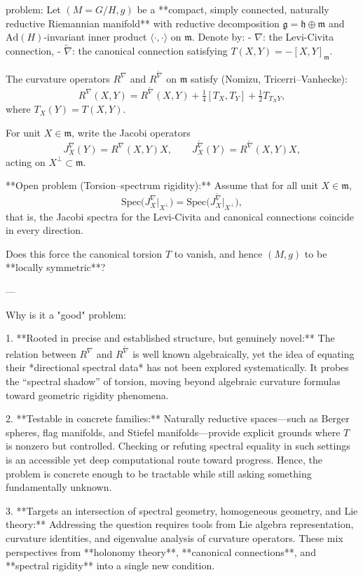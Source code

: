 problem:  
Let \( (M = G/H, g) \) be a **compact, simply connected, naturally reductive Riemannian manifold** with reductive decomposition \( \mathfrak{g} = \mathfrak{h} \oplus \mathfrak{m} \) and \(\mathrm{Ad}(H)\)-invariant inner product \( \langle \cdot , \cdot \rangle\) on \(\mathfrak m\).  
Denote by:  
- \( \nabla \): the Levi-Civita connection,  
- \( \tilde{\nabla} \): the canonical connection satisfying \( T(X,Y) = -[X,Y]_{\mathfrak m} \).

The curvature operators \(R^\nabla\) and \(R^{\tilde{\nabla}}\) on \(\mathfrak m\) satisfy (Nomizu, Tricerri–Vanhecke):
\[
R^\nabla(X,Y) = R^{\tilde{\nabla}}(X,Y) + \tfrac{1}{4}[T_X, T_Y] + \tfrac{1}{2}T_{T_XY},
\]
where \(T_X(Y) = T(X,Y)\).  

For unit \(X \in \mathfrak m\), write the Jacobi operators
\[
J^\nabla_X(Y) = R^\nabla(X,Y)X,  \qquad J^{\tilde{\nabla}}_X(Y) = R^{\tilde{\nabla}}(X,Y)X,
\]
acting on \(X^\perp \subset \mathfrak m\).

**Open problem (Torsion–spectrum rigidity):**  
Assume that for all unit \( X \in \mathfrak m \),
\[
\mathrm{Spec}\big( J^\nabla_X\big|_{X^\perp}\big) = \mathrm{Spec}\big( J^{\tilde{\nabla}}_X\big|_{X^\perp}\big),
\]
that is, the Jacobi spectra for the Levi-Civita and canonical connections coincide in every direction.

Does this force the canonical torsion \(T\) to vanish, and hence \( (M,g) \) to be **locally symmetric**?

---

Why is it a "good" problem:  

1. **Rooted in precise and established structure, but genuinely novel:**  
   The relation between \(R^\nabla\) and \(R^{\tilde{\nabla}}\) is well known algebraically, yet the idea of equating their *directional spectral data* has not been explored systematically. It probes the “spectral shadow” of torsion, moving beyond algebraic curvature formulas toward geometric rigidity phenomena.

2. **Testable in concrete families:**  
   Naturally reductive spaces—such as Berger spheres, flag manifolds, and Stiefel manifolds—provide explicit grounds where \(T\) is nonzero but controlled. Checking or refuting spectral equality in such settings is an accessible yet deep computational route toward progress. Hence, the problem is concrete enough to be tractable while still asking something fundamentally unknown.

3. **Targets an intersection of spectral geometry, homogeneous geometry, and Lie theory:**  
   Addressing the question requires tools from Lie algebra representation, curvature identities, and eigenvalue analysis of curvature operators. These mix perspectives from **holonomy theory**, **canonical connections**, and **spectral rigidity** into a single new condition.

